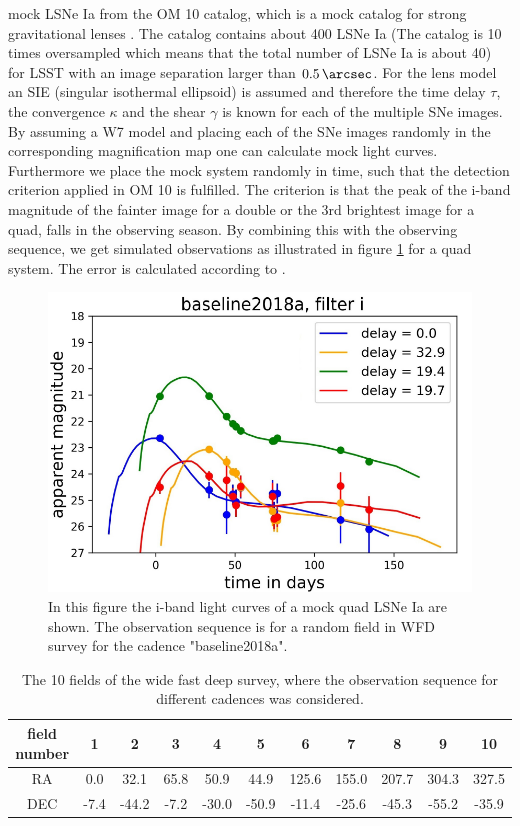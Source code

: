 mock LSNe Ia from the OM 10 catalog, which is a mock catalog for
strong gravitational lenses \citep{Oguri:2010}. The catalog contains
about 400 LSNe Ia (The catalog is 10 times oversampled which means
that the total number of LSNe Ia is about 40) for LSST with an image
separation larger than $\SI{0.5}{\arcsec}$. For the lens model an SIE
(singular isothermal ellipsoid) \citep{Kormann:1994} is assumed and
therefore the time delay $\tau$, the convergence $\kappa$ and the
shear $\gamma$ is known for each of the multiple SNe images. By
assuming a W7 model and placing each of the SNe images randomly in the
corresponding magnification map one can calculate mock light
curves. Furthermore we place the mock system randomly in time, such
that the detection criterion applied in OM 10 is fulfilled. The
criterion is that the peak of the i-band magnitude of the fainter image
for a double or the 3rd brightest image for a quad, falls in the
observing season.
By combining this with the observing sequence, we get simulated
observations as illustrated in figure \ref{fig: simulated observation}
for a quad system. The error is calculated according to \cite[sec 3.5,
p. 67]{2009:LSSTscience}.
\begin{figure}[h!]
\centering
\includegraphics[scale=0.7]{figures/sl_Obsevation_number399_baseline2018a_filter_i_oversampling_00.pdf}
\caption[]{In this figure the i-band light curves of a mock quad LSNe Ia are shown. The observation sequence is for a random field in WFD survey for the cadence "baseline2018a".}
\label{fig: simulated observation}
\end{figure}
%
\begin{table}
\centering
\begin{tabular}{c|c|c|c|c|c|c|c|c|c|c}
field number & 1 & 2 & 3 & 4 & 5& 6 & 7 & 8 & 9 & 10  \\
\hline
RA& 0.0 & 32.1 & 65.8 & 50.9 &44.9& 125.6 & 155.0 & 207.7 & 304.3 & 327.5  \\
\hline
DEC& -7.4 & -44.2 & -7.2 & -30.0 & -50.9& -11.4 & -25.6 & -45.3 & -55.2 & -35.9  \\
\end{tabular}
\caption{The 10 fields of the wide fast deep survey, where the observation sequence for different cadences was considered.}
\label{tab: 10 wfd fields}
\end{table}
%


